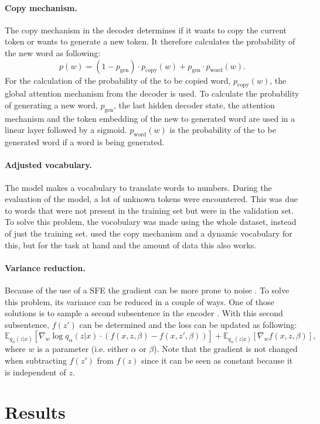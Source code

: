 \paragraph{Copy mechanism.} The copy mechanism \cite{copyMechanism} in the decoder determines if it wants to copy the current token or wants to generate a new token. 
It therefore calculates the probability of the new word as following:
\begin{equation}
    p(w) = (1 - p_{\text{gen}}) \cdot p_{\text{copy}}(w) + p_{\text{gen}} \cdot p_{\text{word}}(w).
\end{equation}
For the calculation of the probability of the to be copied word, $p_{\text{copy}}(w)$, the global attention mechanism from the decoder is used. 
To calculate the probability of generating a new word, $p_{\text{gen}}$, the last hidden decoder state, the attention mechanism and the token embedding of the new to generated word are used in a linear layer followed by a sigmoid.
$p_{\text{word}}(w)$ is the probability of the to be generated word if a word is being generated. 

\paragraph{Adjusted vocabulary.} The model makes a vocabulary to translate words to numbers. 
During the evaluation of the model, a lot of unknown tokens were encountered.
This was due to words that were not present in the training set but were in the validation set. 
To solve this problem, the vocobulary was made using the whole dataset, instead of just the training set. 
 used the copy mechanism and a dynamic vocabulary for this, but for the task at hand and the amount of data this also works.

\paragraph{Variance reduction.} Because of the use of a SFE the gradient can be more prone to noise \cite{niculae2023discretelatentstructureneural}.
To solve this problem, its variance can be reduced in a couple of ways. 
One of those solutions is to sample a second subsentence in the encoder \cite{RennieStevenJ2017SSTf}. 
With this second subsentence, $f(z')$ can be determined and the loss can be updated as following:
\begin{equation}
    \mathbb{E}_{q_{\alpha}(z|x)} [\nabla_w \log q_{\alpha}(z|x) \cdot (f(x, z, \beta)-f(x, z', \beta))] + \mathbb{E}_{q_{\alpha}(z|x)} [\nabla_w f(x, z, \beta)],
\end{equation}
where $w$ is a parameter (i.e. either $\alpha$ or $\beta$). Note that the gradient is not changed when subtracting $f(z')$ from $f(z)$ since it can be seen as constant because it is independent of $z$.

\section{Results}

